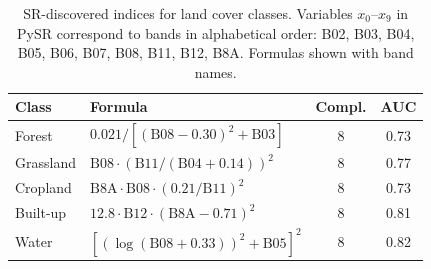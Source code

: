 \documentclass[review,authoryear]{elsarticle}
\begin{document}
\begin{table}[ht]
\centering
\caption{SR-discovered indices for land cover classes. Variables $x_0$--$x_9$ in PySR correspond to bands in alphabetical order: B02, B03, B04, B05, B06, B07, B08, B11, B12, B8A. Formulas shown with band names.}
\label{tab:s_lc_formulas}
\begin{tabular}{llcc}
\toprule
Class & Formula & Compl. & AUC \\
\midrule
Forest   & $0.021 / [(\text{B08} - 0.30)^2 + \text{B03}]$ & 8 & 0.73 \\
Grassland & $\text{B08} \cdot (\text{B11}/(\text{B04} + 0.14))^2$ & 8 & 0.77 \\
Cropland  & $\text{B8A} \cdot \text{B08} \cdot (0.21/\text{B11})^2$ & 8 & 0.73 \\
Built-up  & $12.8 \cdot \text{B12} \cdot (\text{B8A} - 0.71)^2$ & 8 & 0.81 \\
Water     & $[(\log(\text{B08} + 0.33))^2 + \text{B05}]^2$ & 8 & 0.82 \\
\bottomrule
\end{tabular}
\end{table}



\end{document}
